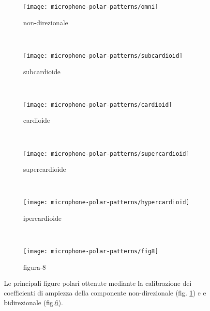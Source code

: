 \begin{refsection}
\begin{figure}[h]
    \centering
    \begin{subfigure}[t]{0.48\textwidth}
        \centering
        \texttt{[image: microphone-polar-patterns/omni]}
        \caption[]{non-direzionale}%
        \label{pol:omni-p}
    \end{subfigure}%
    ~
    \begin{subfigure}[t]{0.48\textwidth}
        \centering
        \texttt{[image: microphone-polar-patterns/subcardioid]}
        \caption[]{subcardioide}%
        \label{pol:sub-p}
    \end{subfigure}
    \\
    \begin{subfigure}[t]{0.48\textwidth}
        \centering
        \texttt{[image: microphone-polar-patterns/cardioid]}
        \caption[]{cardioide}%
        \label{pol:cardio-p}
    \end{subfigure}
    ~
    \begin{subfigure}[t]{0.48\textwidth}
        \centering
        \texttt{[image: microphone-polar-patterns/supercardioid]}
        \caption[]{supercardioide}%
        \label{pol:super-p}
    \end{subfigure}
    \\
    \begin{subfigure}[t]{0.48\textwidth}
        \centering
        \texttt{[image: microphone-polar-patterns/hypercardioid]}
        \caption[]{ipercardioide}%
        \label{pol:iper-p}
    \end{subfigure}
    ~
    \begin{subfigure}[t]{0.48\textwidth}
        \centering
        \texttt{[image: microphone-polar-patterns/fig8]}
        \caption[]{figura-8}%
        \label{pol:fig8-p}
    \end{subfigure}
    \caption[]{Le principali figure polari ottenute mediante la calibrazione dei
    coefficienti di ampiezza della componente non-direzionale (fig. \ref{pol:omni-p}) e
    e bidirezionale (fig.\ref{pol:fig8-p}).}
    \label{pol:princicpali}
\end{figure}

\printbibliography
\end{refsection}
